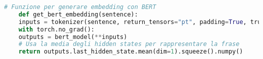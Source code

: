 \begin{lstlisting}[language=Python, caption=Utilizzo di Numpy nel codice]
	# Funzione per generare embedding con BERT
	def get_bert_embedding(sentence):
	inputs = tokenizer(sentence, return_tensors="pt", padding=True, truncation=True, max_length=50)
	with torch.no_grad():
	outputs = bert_model(**inputs)
	# Usa la media degli hidden states per rappresentare la frase
	return outputs.last_hidden_state.mean(dim=1).squeeze().numpy()
\end{lstlisting}

